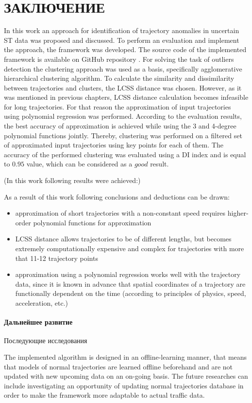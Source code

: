 \chapter{ЗАКЛЮЧЕНИЕ}
\label{ch:ЗАКЛЮЧЕНИЕ}

In this work an approach for identification of trajectory anomalies in uncertain ST data was proposed and discussed. To perform an evaluation and implement the approach, the framework was developed. The source code of the implemented framework is available on GitHub repository \cite{online:mt_anomalies}. For solving the task of outliers detection the clustering approach was used as a basis, specifically agglomerative hierarchical clustering algorithm. To calculate the similarity and dissimilarity between trajectories and clusters, the LCSS distance was chosen. However, as it was mentioned in previous chapters, LCSS distance calculation becomes infeasible for long trajectories. For that reason the approximation of input trajectories using polynomial regression was performed. According to the evaluation results, the best accuracy of approximation is achieved while using the 3 and 4-degree polynomial functions jointly. Thereby, clustering was performed on a filtered set of approximated input trajectories using key points for each of them. The accuracy of the performed clustering was evaluated using a DI index and is equal to $0.95$ value, which can be considered as a $good$ result.

(In this work following results were achieved:)

As a result of this work following conclusions and deductions can be drawn:
\begin{itemize}
	\item approximation of short trajectories with a non-constant speed requires higher-order polynomial functions for approximation
	\item LCSS distance allows trajectories to be of different lengths, but becomes extremely computationally expensive and complex for trajectories with more that 11-12 trajectory points
	\item approximation using a polynomial regression works well with the trajectory data, since it is known in advance that spatial coordinates of a trajectory are functionally dependent on the time (according to principles of physics, speed, acceleration, etc.)
	
\end{itemize}

\bigbreak

\subsubsection{Дальнейшее развитие}
Последующие исследования

The implemented algorithm is designed in an offline-learning manner, that means that models of normal trajectories are learned offline beforehand and are not updated with new upcoming data on an on-going basis. The future researches can include investigating an opportunity of updating normal trajectories database in order to make the framework more adaptable to actual traffic data.
